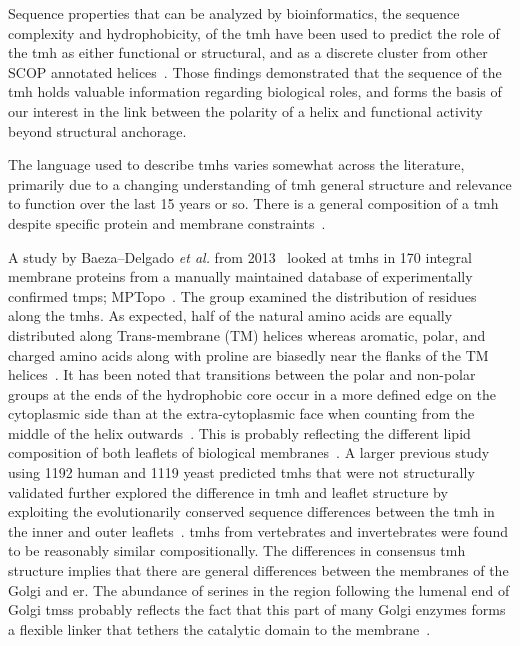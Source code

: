 Sequence properties that can be analyzed by bioinformatics, the sequence complexity and hydrophobicity, of the \gls{tmh} have been used to predict the role of the \gls{tmh} as either functional or structural, and as a discrete cluster from other SCOP annotated helices~\cite{Wong2012}. Those findings demonstrated that the sequence of the \gls{tmh} holds valuable information regarding biological roles, and forms the basis of our interest in the link between the polarity of a helix and functional activity beyond structural anchorage.

The language used to describe \gls{tmh}s varies somewhat across the literature, primarily due to a changing understanding of \gls{tmh} general structure and relevance to function over the last 15 years or so. There is a general composition of a \gls{tmh} despite specific protein and membrane constraints~\cite{Sharpe2010}.

A study by Baeza\---Delgado \textit{ et al.} from 2013~\cite{Baeza-Delgado2013} looked at \gls{tmh}s in 170 integral membrane proteins from a manually maintained database of experimentally confirmed \gls{tmp}s; MPTopo~\cite{Jayasinghe2001}. The group examined the distribution of residues along the \gls{tmh}s. As expected, half of the natural amino acids are equally distributed along Trans-membrane (TM) helices whereas aromatic, polar, and charged amino acids along with proline are biasedly near the flanks of the TM helices~\cite{Baeza-Delgado2013}. It has been noted that transitions between the polar and non-polar groups at the ends of the hydrophobic core occur in a more defined edge on the cytoplasmic side than at the extra-cytoplasmic face when counting from the middle of the helix outwards~\cite{Baeza-Delgado2013}. This is probably reflecting the different lipid composition of both leaflets of biological membranes~\cite{Baeza-Delgado2013}. A larger previous study using 1192 human and 1119 yeast predicted \gls{tmh}s that were not structurally validated further explored the difference in \gls{tmh} and leaflet structure by exploiting the evolutionarily conserved sequence differences between the \gls{tmh} in the inner and outer leaflets~\cite{Sharpe2010}. \gls{tmh}s from vertebrates and invertebrates were found to be reasonably similar compositionally. The differences in consensus \gls{tmh} structure implies that there are general differences between the membranes of the Golgi and \gls{er}. The abundance of serines in the region following the lumenal end of Golgi \gls{tms}s probably reflects the fact that this part of many Golgi enzymes forms a flexible linker that tethers the catalytic domain to the membrane~\cite{Sharpe2010}.

